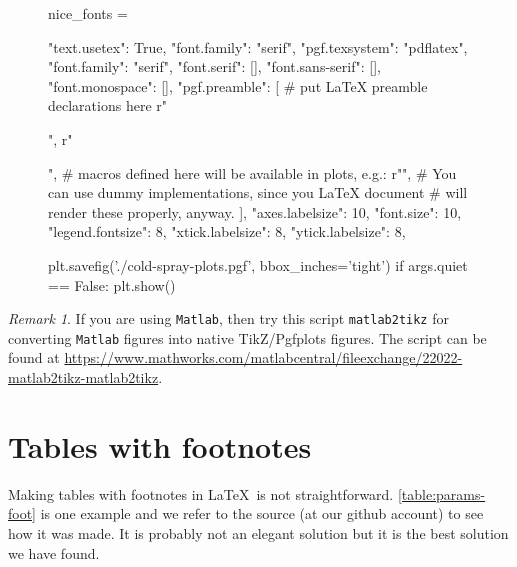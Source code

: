 \documentclass[authoryear,12pta4paper,fleqn]{article}
\numberwithin{equation}{section}
\theoremstyle{remark}
\newtheorem{rmk}{Remark}
\begin{document}
\begin{appendices}
\begin{figure}[!h]
  \begin{snippet}[caption={Python script for plotting data.},label={snippet_matplotlib_pgf},framerule=1pt,tabsize=3]   
    nice_fonts = {
            "text.usetex": True,
            "font.family": "serif",
            "pgf.texsystem": "pdflatex",
            "font.family": "serif",
            "font.serif": [],
            "font.sans-serif": [],
            "font.monospace": [],
            "pgf.preamble": [
            # put LaTeX preamble declarations here
            r"\usepackage[utf8x]{inputenc}",
            r"\usepackage[T1]{fontenc}",
            # macros defined here will be available in plots, e.g.:
            r"\newcommand{\vect}[1]{#1}",
            # You can use dummy implementations, since you LaTeX document
            # will render these properly, anyway.
            ],
            "axes.labelsize": 10,
            "font.size": 10,
            "legend.fontsize": 8,
            "xtick.labelsize": 8,
            "ytick.labelsize": 8,
    }
    plt.savefig('./cold-spray-plots.pgf', bbox_inches='tight') 
    if args.quiet == False:
        plt.show()
  \end{snippet}
\end{figure}

\begin{rmk}
If you are using \texttt{Matlab}, then try this script \texttt{matlab2tikz} for converting \texttt{Matlab} figures into native TikZ/Pgfplots figures. The script can be found at
\url{https://www.mathworks.com/matlabcentral/fileexchange/22022-matlab2tikz-matlab2tikz}.
\end{rmk}

\section{Tables with footnotes}\label{sec:tab-foonote}

Making tables with footnotes in \LaTeX\ is not straightforward.  \cref{table:params-foot} is one example and we refer to the source (at our github account) to see how it was made. It is probably not an elegant solution but it is the best solution we have found.


\end{appendices}
\end{document}
